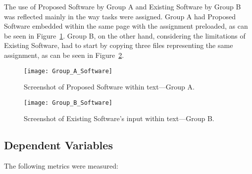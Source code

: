 The use of Proposed Software by Group A and Existing Software by Group B was reflected mainly in the way tasks were assigned.
Group A had Proposed Software embedded within the same page with the assignment preloaded, as can be seen in Figure~\ref{fig:group-a-software}.
Group B, on the other hand, considering the limitations of Existing Software, had to start by copying three files representing the same assignment, as can be seen in Figure~\ref{fig:group-b-software}.

\begin{figure}[ht]
    \centering
    \texttt{[image: Group\_A\_Software]}
    \caption{Screenshot of Proposed Software within text---Group A.}
    \label{fig:group-a-software}
\end{figure}

\begin{figure}[ht]
    \centering
    \texttt{[image: Group\_B\_Software]}
    \caption{Screenshot of Existing Software's input within text---Group B.}
    \label{fig:group-b-software}
\end{figure}

\subsection{Dependent Variables}
\label{sec:methodology-dependent-variables}

The following metrics were measured:

